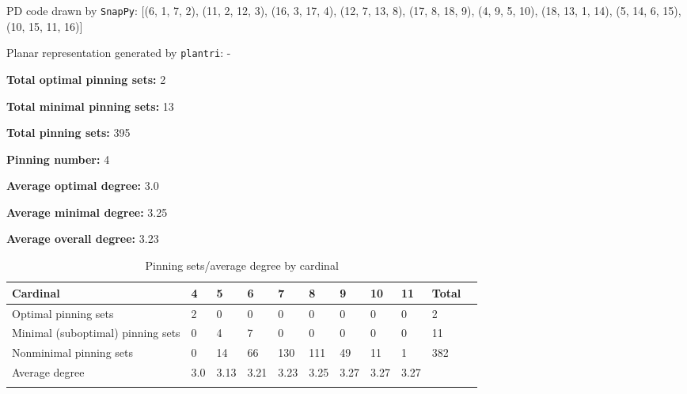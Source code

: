 \documentclass{article}%
\begin{document}
{\small\noindent PD code drawn by \texttt{SnapPy}: [(6, 1, 7, 2), (11, 2, 12, 3), (16, 3, 17, 4), (12, 7, 13, 8), (17, 8, 18, 9), (4, 9, 5, 10), (18, 13, 1, 14), (5, 14, 6, 15), (10, 15, 11, 16)]}

{\small\noindent Planar representation generated by \texttt{plantri}: -}

\begin{multicols}{2}
{\normalsize \noindent\textbf{Total optimal pinning sets:} 2

\noindent\textbf{Total minimal pinning sets:} 13

\noindent\textbf{Total pinning sets:} 395

\noindent\textbf{Pinning number:} 4

}
\columnbreak

{\normalsize \noindent\textbf{Average optimal degree:} 3.0

\noindent\textbf{Average minimal degree:} 3.25

\noindent\textbf{Average overall degree:} 3.23

}
\end{multicols}

\begin{table}[ht]
	\caption{Pinning sets/average degree by cardinal}
	\centering
	\renewcommand{\arraystretch}{1.5}
	\begin{tabularx}{\textwidth}{lXXXXXXXXXX}
		\toprule
			Cardinal & 4 & 5 & 6 & 7 & 8 & 9 & 10 & 11 & Total\\
			\hline
			Optimal pinning sets & 2 & 0 & 0 & 0 & 0 & 0 & 0 & 0 & 2 \\
			Minimal (suboptimal) pinning sets & 0 & 4 & 7 & 0 & 0 & 0 & 0 & 0 & 11 \\
			Nonminimal pinning sets & 0 & 14 & 66 & 130 & 111 & 49 & 11 & 1 & 382 \\
			Average degree & 3.0 & 3.13 & 3.21 & 3.23 & 3.25 & 3.27 & 3.27 & 3.27 &  \\
		\bottomrule \\ 
	\end{tabularx}
\end{table}
\end{document}
